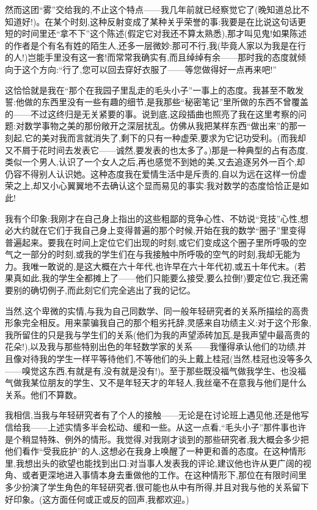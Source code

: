  然而这团“雾”交给我的,不止这个特点——我几年前就已经察觉它了(晚知道总比不知道好!)。在某个时刻,这种反射变成了某种关乎荣誉的事:我要是在比说这句话更短的时间里还“拿不下”这个陈述(假定它对我还不算太熟悉),那才叫见鬼!如果陈述的作者是个有名有姓的陌生人,还多一层微妙:那可不行,我(毕竟人家以为我是在行的人!)岂能手里没有这一套!而常常我确实有,而且绰绰有余——那时我的态度就倾向于这个方向:“行了,您可以回去穿好衣服了——等您做得好一点再来吧!”

这恰恰就是我在“那个在我园子里乱走的毛头小子”一事上的态度。我甚至不敢发誓:他做的东西里没有一些有趣的细节,是我那些“秘密笔记”里所做的东西不曾覆盖的——不过这终归是无关紧要的事。说到底,这段插曲也照亮了我在这里考察的问题:对数学事物之美的那份敞开之深层扰乱。仿佛从我把某样东西“做出来”的那一刻起,它的美对我而言就消失了,剩下的只有一种虚荣,要求为它记功受利。(而我却又不屑于花时间去发表它——诚然,要发表的也太多了。)那是一种典型的占有态度,类似一个男人,认识了一个女人之后,再也感觉不到她的美,又去追逐另外一百个,却仍容不得别人认识她。这种态度我在爱情生活中是斥责的,自以为远在这样一份虚荣之上,却又小心翼翼地不去确认这个显而易见的事实:我对数学的态度恰恰正是如此!

 我有个印象:我刚才在自己身上指出的这些粗鄙的竞争心性、不妨说“竞技”心性,想必大约就在它们于我自己身上变得普遍的那个时候,开始在我的数学“圈子”里变得普遍起来。要我在时间上定位它们出现的时刻,或它们变成这个圈子里所呼吸的空气之一部分的时刻,或我的学生们在与我接触中所呼吸的空气的时刻,我却无能为力。我唯一敢说的,是这大概在六十年代,也许早在六十年代初,或五十年代末。(若果真如此,我的学生全都摊上了——他们只能要么接受,要么拉倒!)要定位它,我还需要别的确切例子,而此刻它们完全逃出了我的记忆。

当然,这个卑微的实情,与我为自己同数学、同一般年轻研究者的关系所描绘的高贵形象完全相反。用来蒙骗我自己的那个粗劣托辞,灵感来自功绩主义:对于这个形象,我所留住的只是我与学生们的关系(他们为我的声望添砖加瓦,是我声望中最高贵的花朵!),以及我与那些特别出色的年轻数学家的关系——我懂得承认他们的功绩,并且像对待我的学生一样平等待他们,不等他们的头上戴上桂冠(当然,桂冠也没等多久——嗅觉这东西,有就是有,没有就是没有!)。至于那些既没福气做我学生、也没福气做我某位朋友的学生、又不是年轻天才的年轻人,我丝毫不在意我与他们是什么关系。他们不算数。

我相信,当我与年轻研究者有了个人的接触——无论是在讨论班上遇见他,还是他写信给我——上述实情多半会松动、缓和一些。从这一点看,“毛头小子”那件事也许是个稍显特殊、例外的情形。我觉得,对我刚才谈到的那些研究者,我大概会多少把他们看作“受我庇护”的人,这想必在我身上唤醒了一种更和善的态度。在这种情形里,我想出头的欲望也能找到出口:对当事人发表我的评论,建议他也许从更广阔的视角、或者更深地进入事情本身去重做他的工作。在这种情形下,那位在有限时间里多少扮演了学生角色的年轻研究者,很可能也从中有所得,并且对我与他的关系留下好印象。(这方面任何或正或反的回声,我都欢迎。)

